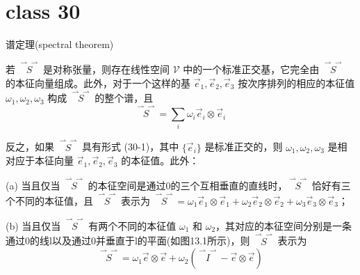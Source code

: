 \documentclass[12pt, a4paper, oneside, UTF8]{ctexbook}  %
\newcommand{\vvec}{\overset{\rightharpoonup\!\!\!\! \rightharpoonup}}
\begin{document}
\section{class 30}
\begin{defn}
    谱定理(spectral theorem)

    若 $\vvec{S}$ 是对称张量，则存在线性空间 $\mathcal{V}$ 中的一个标准正交基，它完全由 $\vvec{S}$ 的本征向量组成。此外，对于一个这样的基 $\vec{e}_1, \vec{e}_2, \vec{e}_3$ 按次序排列的相应的本征值 $\omega_1, \omega_2, \omega_3$ 构成 $\vvec{S}$ 的整个谱，且
    \[
    \vvec{S} = \sum_i \omega_i \vec{e}_i \otimes \vec{e}_i
    \tag{30-1}
    \]

    反之，如果 $\vvec{S}$ 具有形式 (30-1)，其中 $\{\vec{e}_i\}$ 是标准正交的，则 $\omega_1, \omega_2, \omega_3$ 是相对应于本征向量 $\vec{e}_1, \vec{e}_2, \vec{e}_3$ 的本征值。此外：
    
    (a) 当且仅当 $\vvec{S}$ 的本征空间是通过0的三个互相垂直的直线时，$\vvec{S}$ 恰好有三个不同的本征值，且 $\vvec{S}$ 表示为 $\vvec{S} = \omega_1 \vec{e}_1 \otimes \vec{e}_1 + \omega_2 \vec{e}_2 \otimes \vec{e}_2 + \omega_3 \vec{e}_3 \otimes \vec{e}_3$；
\begin{flushleft}
    \begin{minipage}[t]{0.7\textwidth}
        \vspace{0pt}
        \raggedright 
    (b) 当且仅当 $\vvec{S}$ 有两个不同的本征值 $\omega_1$ 和 $\omega_2$，其对应的本征空间分别是一条通过0的线l以及通过0并垂直于l的平面(如图13.1所示)，则 $\vvec{S}$ 表示为
    \[
        \vvec{S} = \omega_1 \vec{e} \otimes \vec{e} + \omega_2 (\vvec{I} - \vec{e} \otimes \vec{e})
        \tag{30-2}
    \]
           

\end{minipage}
\end{flushleft}
\end{defn}
\end{document}
